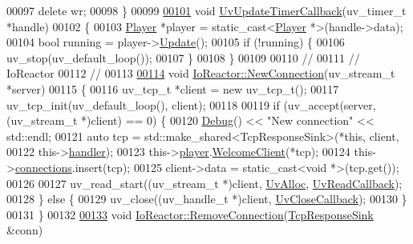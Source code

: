 \begin{DoxyCode}
00097     \textcolor{keyword}{delete} wr;
00098 \}
00099 
\hypertarget{io__reactor_8cpp_source_l00101}{}\hyperlink{io__reactor_8cpp_a4bdadddb08a579d655018f6fa0ac908e}{00101} \textcolor{keywordtype}{void} \hyperlink{io__reactor_8cpp_a4bdadddb08a579d655018f6fa0ac908e}{UvUpdateTimerCallback}(uv\_timer\_t *handle)
00102 \{
00103     \hyperlink{classPlayer}{Player} *player = \textcolor{keyword}{static\_cast<}\hyperlink{classPlayer}{Player} *\textcolor{keyword}{>}(handle->data);
00104     \textcolor{keywordtype}{bool} running = player->\hyperlink{classPlayer_a91f887a024035be5030aa4b3384705fa}{Update}();
00105     \textcolor{keywordflow}{if} (!running) \{
00106         uv\_stop(uv\_default\_loop());
00107     \}
00108 \}
00109 
00110 \textcolor{comment}{//}
00111 \textcolor{comment}{// IoReactor}
00112 \textcolor{comment}{//}
00113 
\hypertarget{io__reactor_8cpp_source_l00114}{}\hyperlink{classIoReactor_a535c6ff0899391afc02c87b1dfe7c6e2}{00114} \textcolor{keywordtype}{void} \hyperlink{classIoReactor_a535c6ff0899391afc02c87b1dfe7c6e2}{IoReactor::NewConnection}(uv\_stream\_t *server)
00115 \{
00116     uv\_tcp\_t *client = \textcolor{keyword}{new} uv\_tcp\_t();
00117     uv\_tcp\_init(uv\_default\_loop(), client);
00118 
00119     \textcolor{keywordflow}{if} (uv\_accept(server, (uv\_stream\_t *)client) == 0) \{
00120         \hyperlink{classDebug}{Debug}() << \textcolor{stringliteral}{"New connection"} << std::endl;
00121         \textcolor{keyword}{auto} tcp = std::make\_shared<TcpResponseSink>(*\textcolor{keyword}{this}, client,
00122                                                      this->\hyperlink{classIoReactor_a81bf838edb7adf1edcb992bfe61d6b78}{handler});
00123         this->\hyperlink{classIoReactor_a795397b36da55b59bff63b455a344dea}{player}.\hyperlink{classPlayer_aac35c9a49758150d5c5e0ea2fcd94d16}{WelcomeClient}(*tcp);
00124         this->\hyperlink{classIoReactor_a15617cf44d3c50d5c2d31e8b1812e140}{connections}.insert(tcp);
00125         client->data = \textcolor{keyword}{static\_cast<}\textcolor{keywordtype}{void} *\textcolor{keyword}{>}(tcp.get());
00126 
00127         uv\_read\_start((uv\_stream\_t *)client, \hyperlink{io__reactor_8cpp_ab0c51a1d8447db72e81a13d45448b85f}{UvAlloc}, \hyperlink{io__reactor_8cpp_a8c1937e7aebd228e6a5eab19f1add9f9}{UvReadCallback});
00128     \} \textcolor{keywordflow}{else} \{
00129         uv\_close((uv\_handle\_t *)client, \hyperlink{io__reactor_8cpp_ab85791c3e9c737453047decfbb7388f4}{UvCloseCallback});
00130     \}
00131 \}
00132 
\hypertarget{io__reactor_8cpp_source_l00133}{}\hyperlink{classIoReactor_af31bb722acf08d10eaa46ea7a1a5d4ca}{00133} \textcolor{keywordtype}{void} \hyperlink{classIoReactor_af31bb722acf08d10eaa46ea7a1a5d4ca}{IoReactor::RemoveConnection}(\hyperlink{classTcpResponseSink}{TcpResponseSink} &conn)

\end{DoxyCode}
